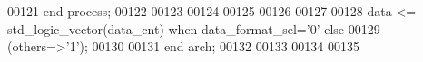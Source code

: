 \begin{DoxyCode}
00121     \textcolor{keywordflow}{end} \textcolor{keywordflow}{process};
00122 
00123 
00124      
00125      
00126      
00127      
00128      \textcolor{vhdlchar}{data} \textcolor{vhdlchar}{<=} \textcolor{comment}{std\_logic\_vector}\textcolor{vhdlchar}{(}\textcolor{vhdlchar}{data_cnt}\textcolor{vhdlchar}{)} \textcolor{keywordflow}{when} \textcolor{vhdlchar}{data_format_sel}\textcolor{vhdlchar}{=}\textcolor{vhdlchar}{'}\textcolor{vhdllogic}{}\textcolor{vhdllogic}{0}\textcolor{vhdlchar}{'} \textcolor{keywordflow}{else} 
00129               \textcolor{vhdlchar}{(}\textcolor{keywordflow}{others}\textcolor{vhdlchar}{=}\textcolor{vhdlchar}{>}\textcolor{vhdlchar}{'}\textcolor{vhdllogic}{}\textcolor{vhdllogic}{1}\textcolor{vhdlchar}{'}\textcolor{vhdlchar}{)};
00130   
00131 \textcolor{keywordflow}{end} \textcolor{vhdlchar}{arch};   
00132 
00133 
00134 
00135 
\end{DoxyCode}
